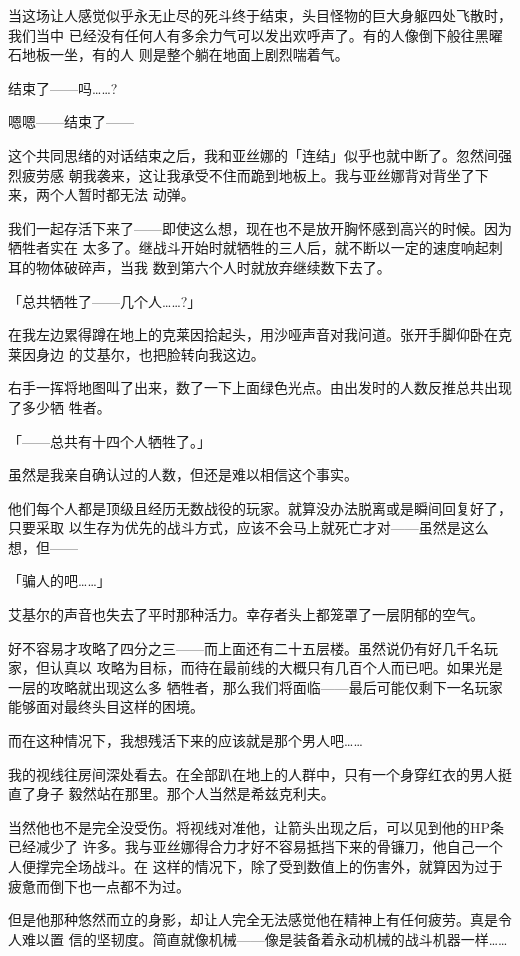 \documentclass[11pt]{book}
\begin{document}
当这场让人感觉似乎永无止尽的死斗终于结束，头目怪物的巨大身躯四处飞散时，我们当中
已经没有任何人有多余力气可以发出欢呼声了。有的人像倒下般往黑曜石地板一坐，有的人
则是整个躺在地面上剧烈喘着气。

结束了——吗……?

嗯嗯——结束了——

这个共同思绪的对话结束之后，我和亚丝娜的「连结」似乎也就中断了。忽然间强烈疲劳感
朝我袭来，这让我承受不住而跪到地板上。我与亚丝娜背对背坐了下来，两个人暂时都无法
动弹。

我们一起存活下来了——即使这么想，现在也不是放开胸怀感到高兴的时候。因为牺牲者实在
太多了。继战斗开始时就牺牲的三人后，就不断以一定的速度响起刺耳的物体破碎声，当我
数到第六个人时就放弃继续数下去了。

「总共牺牲了——几个人……?」

在我左边累得蹲在地上的克莱因拾起头，用沙哑声音对我问道。张开手脚仰卧在克莱因身边
的艾基尔，也把脸转向我这边。

右手一挥将地图叫了出来，数了一下上面绿色光点。由出发时的人数反推总共出现了多少牺
牲者。

「——总共有十四个人牺牲了。」

虽然是我亲自确认过的人数，但还是难以相信这个事实。

他们每个人都是顶级且经历无数战役的玩家。就算没办法脱离或是瞬间回复好了，只要采取
以生存为优先的战斗方式，应该不会马上就死亡才对——虽然是这么想，但——

「骗人的吧……」

艾基尔的声音也失去了平时那种活力。幸存者头上都笼罩了一层阴郁的空气。

好不容易才攻略了四分之三——而上面还有二十五层楼。虽然说仍有好几千名玩家，但认真以
攻略为目标，而待在最前线的大概只有几百个人而已吧。如果光是一层的攻略就出现这么多
牺牲者，那么我们将面临——最后可能仅剩下一名玩家能够面对最终头目这样的困境。

而在这种情况下，我想残活下来的应该就是那个男人吧……

我的视线往房间深处看去。在全部趴在地上的人群中，只有一个身穿红衣的男人挺直了身子
毅然站在那里。那个人当然是希兹克利夫。

当然他也不是完全没受伤。将视线对准他，让箭头出现之后，可以见到他的HP条已经减少了
许多。我与亚丝娜得合力才好不容易抵挡下来的骨镰刀，他自己一个人便撑完全场战斗。在
这样的情况下，除了受到数值上的伤害外，就算因为过于疲惫而倒下也一点都不为过。

但是他那种悠然而立的身影，却让人完全无法感觉他在精神上有任何疲劳。真是令人难以置
信的坚韧度。简直就像机械——像是装备着永动机械的战斗机器一样……
\end{document}
